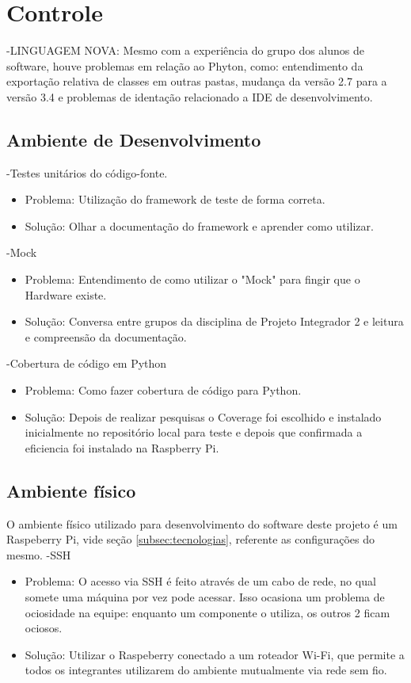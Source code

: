 \section{Controle}

-LINGUAGEM NOVA: Mesmo com a experiência do grupo dos alunos de software, houve problemas em relação ao Phyton, como: entendimento da exportação relativa de classes em outras pastas, mudança da versão 2.7 para a versão 3.4 e problemas de identação relacionado a IDE de desenvolvimento.

\subsection{Ambiente de Desenvolvimento}

-Testes unitários do código-fonte.
    \begin{itemize}
      \item Problema: Utilização do framework de teste de forma correta.
	  \item Solução: Olhar a documentação do framework e aprender como utilizar.

    \end{itemize}

-Mock
 \begin{itemize}
      \item Problema: Entendimento de como utilizar o "Mock" para fingir que o Hardware existe.
	  \item Solução: Conversa entre grupos da disciplina de Projeto Integrador 2 e leitura e compreensão da documentação.

    \end{itemize}

-Cobertura de código em Python
 \begin{itemize}
      \item Problema: Como fazer cobertura de código para Python.
	  \item Solução: Depois de realizar pesquisas o Coverage foi escolhido e instalado inicialmente no repositório local para teste e depois que confirmada a eficiencia foi instalado na Raspberry Pi.
    \end{itemize}

\subsection{Ambiente físico}
O ambiente físico utilizado para desenvolvimento do software deste projeto é um Raspeberry Pi, vide seção \ref{subsec:tecnologias}, referente as configurações do mesmo.
-SSH
 \begin{itemize}
      \item Problema:  O acesso via SSH é feito através de um cabo de rede, no qual somete uma máquina por vez pode acessar. Isso ocasiona um problema de ociosidade na equipe: enquanto um componente o utiliza, os outros 2 ficam ociosos.
	  \item Solução: Utilizar o Raspeberry conectado a um roteador Wi-Fi, que permite a todos os integrantes utilizarem do ambiente mutualmente via rede sem fio.
    \end{itemize}

